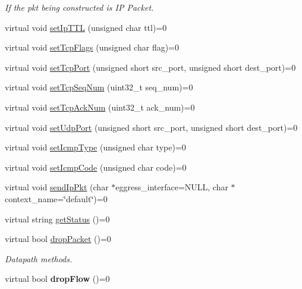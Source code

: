 \begin{DoxyCompactItemize}
\begin{DoxyCompactList}\small\item\em If the pkt being constructed is I\-P Packet. \end{DoxyCompactList}\item 
virtual void \hyperlink{classnxos_1_1NxPkt_a793cd5142b6b8a9575eb479620b9d692}{set\-Ip\-T\-T\-L} (unsigned char ttl)=0
\item 
virtual void \hyperlink{classnxos_1_1NxPkt_a5293a3be5b2e69a870943655aeb18020}{set\-Tcp\-Flags} (unsigned char flag)=0
\item 
virtual void \hyperlink{classnxos_1_1NxPkt_a0e369855057ccdcb446828bcf248a61a}{set\-Tcp\-Port} (unsigned short src\-\_\-port, unsigned short dest\-\_\-port)=0
\item 
virtual void \hyperlink{classnxos_1_1NxPkt_a338ac8f262e1db93eaa7369665078ca8}{set\-Tcp\-Seq\-Num} (uint32\-\_\-t seq\-\_\-num)=0
\item 
virtual void \hyperlink{classnxos_1_1NxPkt_a6439b4b7ac0081742023868a8ae5f7e4}{set\-Tcp\-Ack\-Num} (uint32\-\_\-t ack\-\_\-num)=0
\item 
virtual void \hyperlink{classnxos_1_1NxPkt_adfe3a4097fb3f58a35d7e2d18193336c}{set\-Udp\-Port} (unsigned short src\-\_\-port, unsigned short dest\-\_\-port)=0
\item 
virtual void \hyperlink{classnxos_1_1NxPkt_a64cd637e58844f46f7cba71653223592}{set\-Icmp\-Type} (unsigned char type)=0
\item 
virtual void \hyperlink{classnxos_1_1NxPkt_a6c332d450a92a85f0cce606d9fa08597}{set\-Icmp\-Code} (unsigned char code)=0
\item 
virtual void \hyperlink{classnxos_1_1NxPkt_a747af6a0da66e78ca275cd2fe8799853}{send\-Ip\-Pkt} (char $\ast$eggress\-\_\-interface=N\-U\-L\-L, char $\ast$context\-\_\-name=\char`\"{}default\char`\"{})=0
\item 
virtual string \hyperlink{classnxos_1_1NxPkt_a16aa05cd6de229fc883e23a48797a639}{get\-Status} ()=0
\item 
\hypertarget{classnxos_1_1NxPkt_a6b7d8d892eb84cc03bb352b275574ab2}{virtual bool \hyperlink{classnxos_1_1NxPkt_a6b7d8d892eb84cc03bb352b275574ab2}{drop\-Packet} ()=0}\label{classnxos_1_1NxPkt_a6b7d8d892eb84cc03bb352b275574ab2}

\begin{DoxyCompactList}\small\item\em Datapath methods. \end{DoxyCompactList}\item 
\hypertarget{classnxos_1_1NxPkt_a5f7305a5d496c42a2ca38412f7dfb051}{virtual bool {\bfseries drop\-Flow} ()=0}\label{classnxos_1_1NxPkt_a5f7305a5d496c42a2ca38412f7dfb051}


\end{DoxyCompactItemize}
